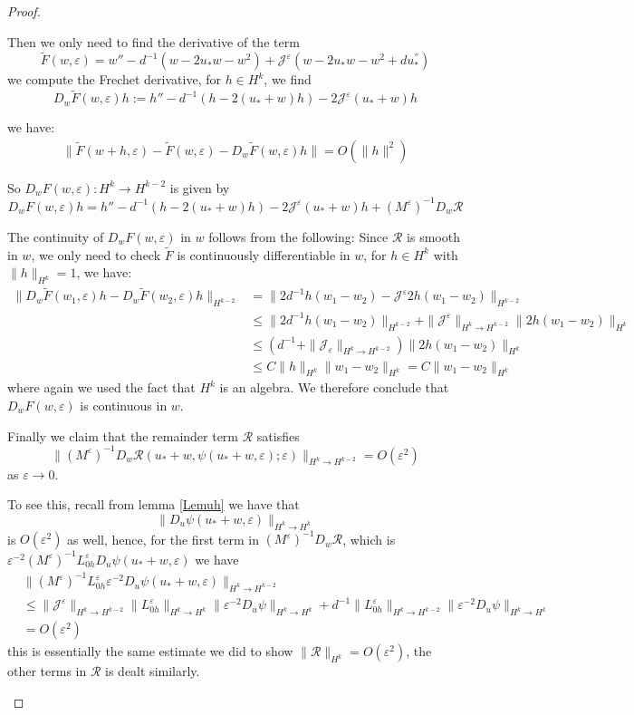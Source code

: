 \documentclass[letterpaper,11pt]{article}
\newcommand{\eps}{\varepsilon}
\numberwithin{equation}{section}
\theoremstyle{plain}
\begin{document}
\begin{proof}
\begin{enumerate}
Then we only need to find the derivative of the term 
\[
\tilde{F}(w,\eps)= w'' - d^{-1}(w-2u_*w-w^2)+\mathcal{J}^{\eps}(w-2u_*w-w^2+du_*^{''})
\]
we compute the Frechet derivative, for $h \in H^k$, we find
\[
D_w\tilde{F}(w,\eps) h := h''-d^{-1}(h - 2(u_*+w)h)-2\mathcal{J}^{\eps}(u_*+w)h
\]

we have:
\begin{align*}
\|\tilde{F}(w+h,\eps)-\tilde{F}(w,\eps) - D_w\tilde{F}(w,\eps) h\| = O(\|h\|^2)
\end{align*}

So $D_wF(w,\eps) : H^k \to H^{k-2}$ is given by 
\[
D_wF(w,\eps) h = h''-d^{-1}(h - 2(u_*+w)h)-2\mathcal{J}^{\eps}(u_*+w)h + (M^\eps)^{-1}D_w\mathcal{R}
\]


The continuity of $D_wF(w,\eps)$ in $w$ follows from the following: Since $\mathcal{R}$ is smooth in $w$, we only need to check $\tilde{F}$ is continuously differentiable in $w$, for $h \in H^k$ with $\|h\|_{H^k}=1$, we have:
\begin{align*}
\| D_w\tilde{F}(w_1,\eps)h-D_w\tilde{F}(w_2,\eps)h\|_{H^{k-2}} &=\| 2d^{-1}h(w_1-w_2)-\mathcal{J}^{\eps} 2h(w_1-w_2)\|_{H^{k-2}} \\
& \le \| 2d^{-1}h(w_1-w_2)\|_{H^{k-2}}+\|\mathcal{J}^{\eps}\|_{H^k \to H^{k-2}}\| 2h(w_1-w_2)\|_{H^k} \\
& \le (d^{-1}+\|\mathcal{J}_\eps\|_{H^k\to H^{k-2}}) \|2h(w_1-w_2) \|_{H^k} \\
& \le C \|h\|_{H^k} \|w_1-w_2\|_{H^k} = C\|w_1-w_2\|_{H^k}
\end{align*}
where again we used the fact that $H^k$ is an algebra.  We therefore conclude that $D_wF(w,\eps)$ is continuous in $w$.


Finally we claim that the remainder term $\mathcal{R}$ satisfies 
\[
\|(M^{\eps})^{-1}D_w\mathcal{R}(u_*+w,\psi(u_*+w,\eps);\eps) \|_{H^k \to H^{k-2}}= O(\eps^2)
\]
as $\eps \to 0$.

To see this, recall from lemma \ref{Lemuh} we have that 
\[
\| D_u\psi(u_*+w,\eps) \|_{H^k \to H^k}
\] is $O(\eps^2)$ as well, hence, for the first term in $(M^{\eps})^{-1}D_w\mathcal{R}$, which is $\eps^{-2}(M^{\eps})^{-1}L_{0h}^{\eps}D_u\psi(u_*+w,\eps)$ we have
\begin{align*}
& \|(M^\eps)^{-1}L_{0h}^\eps \eps^{-2}D_u\psi(u_*+w,\eps) \|_{H^k \to H^{k-2}}  \\
&\le \|\mathcal{J}^{\eps}\|_{H^k \to H^{k-2}}\| L_{0h}^{\eps}\|_{H^k\to H^k}\|\eps^{-2}D_u\psi\|_{H^k \to H^k}+d^{-1}\|L_{0h}^{\eps}\|_{H^k \to H^{k-2}}\|\eps^{-2}D_u\psi\|_{H^k \to H^k}\\
& = O(\eps^2)
\end{align*}
this is essentially the same estimate we did to show $\|\mathcal{R}\|_{H^k} = O(\eps^2)$, the other terms in $\mathcal{R}$ is dealt similarly.


\end{enumerate}
\end{proof}
\end{document}
